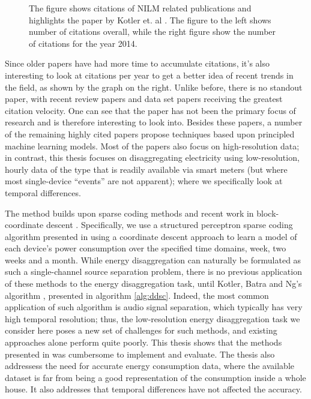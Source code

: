 \begin{figure}[H]
\begin{minipage}{.45\textwidth}
	\end{minipage}
	\caption{The figure shows citations of NILM related publications and highlights the paper by Kotler et. al \cite{DDSC}. The figure to the left shows number of citations overall, while the right figure show the number of citations for the year 2014. \protect\footnotemark}
\end{figure}

Since older papers have had more time to accumulate citations, it's also interesting to look at citations per year to get a better idea of recent trends in the field, as shown by the graph on the right. Unlike before, there is no standout paper, with recent review papers and data set papers receiving the greatest citation velocity. One can see that the paper has not been the primary focus of research and is therefore interesting to look into. Besides these papers, a number of the remaining highly cited papers propose techniques based upon principled machine learning models. Most of the papers also focus on high-resolution data; in contrast, this thesis focuses on disaggregating electricity using low-resolution, hourly data of the type that is readily available via smart meters (but where most single-device “events” are not apparent); where we specifically look at temporal differences.

The method builds upon sparse coding methods and recent work in block-coordinate descent \cite{blondel,block2}. Specifically, we use a structured perceptron sparse coding algorithm presented in \cite{DDSC} using a coordinate descent approach to learn a model of each device’s power consumption over the specified time domains, week, two weeks and a month. While energy disaggregation can naturally be formulated as such a single-channel source separation problem, there is no previous application of these methods to the energy disaggregation task, until Kotler, Batra and Ng's algorithm \cite{DDSC}, presented in algorithm \ref{alg:ddsc}. Indeed, the most common application of such algorithm is audio signal separation, which typically has very high temporal resolution; thus, the low-resolution energy disaggregation task we consider here poses a new set of challenges for such methods, and existing approaches alone perform quite poorly. This thesis shows that the methods presented in \cite{DDSC} was cumbersome to implement and evaluate. The thesis also addressess the need for accurate energy consumption data, where the available dataset is far from being a good representation of the consumption inside a whole house. It also addresses that temporal differences have not affected the accuracy.

